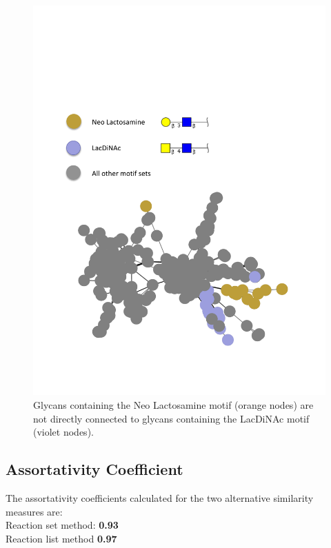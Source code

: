 \documentclass[12pt,a4paper]{article}
\begin{document}
\begin{figure}[H]
\centering 
\includegraphics[scale=0.9]{motif_similarity_exploration/Neo_Lactosamine_vs_LacDiNAc.pdf} 
\caption{Glycans containing the Neo Lactosamine motif (orange nodes) are not directly connected to glycans containing the LacDiNAc motif (violet nodes).}
\label{fig:Neo_Lactosamine_vs_LacDiNAc}
\end{figure}

\newpage
\subsection{Assortativity Coefficient}
\label{sec:assortativity_coefficient}

The assortativity coefficients calculated for the two alternative similarity measures are:\\

Reaction set method: {\bf 0.93}\\
\indent Reaction list method {\bf 0.97}\\
\end{document}
